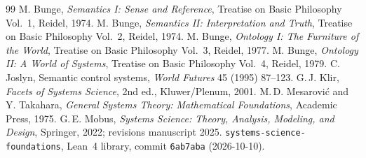 \documentclass[11pt]{article}
\theoremstyle{definition}
\theoremstyle{remark}
\begin{document}
\begin{thebibliography}{99}\small
{} M. Bunge, \emph{Semantics I: Sense and Reference}, Treatise on Basic Philosophy Vol.~1, Reidel, 1974.
 M. Bunge, \emph{Semantics II: Interpretation and Truth}, Treatise on Basic Philosophy Vol.~2, Reidel, 1974.
 M. Bunge, \emph{Ontology I: The Furniture of the World}, Treatise on Basic Philosophy Vol.~3, Reidel, 1977.
 M. Bunge, \emph{Ontology II: A World of Systems}, Treatise on Basic Philosophy Vol.~4, Reidel, 1979.
 C. Joslyn, Semantic control systems, \emph{World Futures} 45 (1995) 87--123.
 G.\,J. Klir, \emph{Facets of Systems Science}, 2nd ed., Kluwer/Plenum, 2001.
 M.\,D. Mesarovi\'c and Y. Takahara, \emph{General Systems Theory: Mathematical Foundations}, Academic Press, 1975.
 G.\,E. Mobus, \emph{Systems Science: Theory, Analysis, Modeling, and Design}, Springer, 2022; revisions manuscript 2025.
 \texttt{systems-science-foundations}, Lean~4 library, commit \texttt{6ab7aba} (2026-10-10).
\end{thebibliography}
\end{document}
